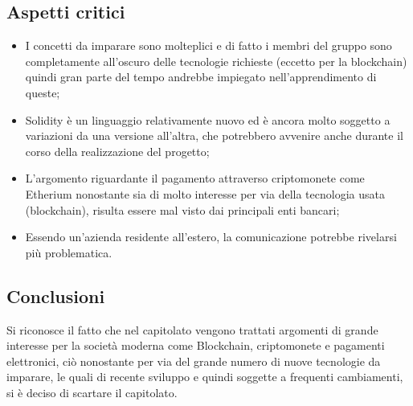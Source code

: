\subsection{Aspetti critici}
\begin{itemize}
\item I concetti da imparare sono molteplici e di fatto i membri del gruppo sono completamente all'oscuro delle tecnologie richieste (eccetto per la blockchain) quindi gran parte del tempo andrebbe impiegato nell'apprendimento di queste;
\item Solidity \`e un linguaggio relativamente nuovo ed \`e  ancora molto soggetto a variazioni da una versione all'altra, che potrebbero avvenire anche durante il corso della realizzazione del progetto;
\item L'argomento riguardante il pagamento attraverso criptomonete come Etherium nonostante sia di molto interesse per via della tecnologia usata (blockchain), risulta essere mal visto dai principali enti bancari;
\item Essendo un'azienda residente all'estero, la comunicazione potrebbe rivelarsi pi\`u problematica.
\end{itemize}
\subsection{Conclusioni}
Si riconosce il fatto che nel capitolato vengono trattati argomenti di grande interesse per la società moderna come Blockchain, criptomonete e pagamenti elettronici, ciò nonostante per via del grande numero di nuove tecnologie da imparare, le quali di recente sviluppo e quindi soggette a frequenti cambiamenti, si è deciso di scartare il capitolato.